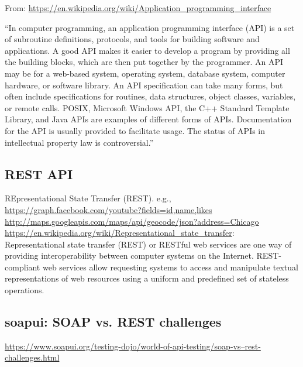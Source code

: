 \documentclass[11pt]{article}
\begin{document}
From: 
\href{https://en.wikipedia.org/wiki/Application\_programming\_interface}{https://en.wikipedia.org/wiki/Application\_programming\_interface}

\noindent
``In computer programming, an application programming interface (API) is a set of subroutine definitions, protocols, and tools for building software and applications. A good API makes it easier to develop a program by providing all the building blocks, which are then put together by the programmer. An API may be for a web-based system, operating system, database system, computer hardware, or software library. An API specification can take many forms, but often include specifications for routines, data structures, object classes, variables, or remote calls. POSIX, Microsoft Windows API, the C++ Standard Template Library, and Java APIs are examples of different forms of APIs. Documentation for the API is usually provided to facilitate usage. The status of APIs in intellectual property law is controversial.''


\subsection{REST API}
REpresentational State Transfer (REST). 
e.g.,\\
\href{https://graph.facebook.com/youtube?fields=id,name,likes}{https://graph.facebook.com/youtube?fields=id,name,likes}\\
\href{http://maps.googleapis.com/maps/api/geocode/json?address=Chicago}{http://maps.googleapis.com/maps/api/geocode/json?address=Chicago}\\

\href{https://en.wikipedia.org/wiki/Representational_state_transfer}{https://en.wikipedia.org/wiki/Representational\_state\_transfer}: \\
Representational state transfer (REST) or RESTful web services are one way of providing interoperability between computer systems on the Internet. REST-compliant web services allow requesting systems to access and manipulate textual representations of web resources using a uniform and predefined set of stateless operations.


    \subsection{soapui: SOAP vs. REST challenges}
\href{https://www.soapui.org/testing-dojo/world-of-api-testing/soap-vs--rest-challenges.html}{https://www.soapui.org/testing-dojo/world-of-api-testing/soap-vs--rest-challenges.html}
\end{document}
